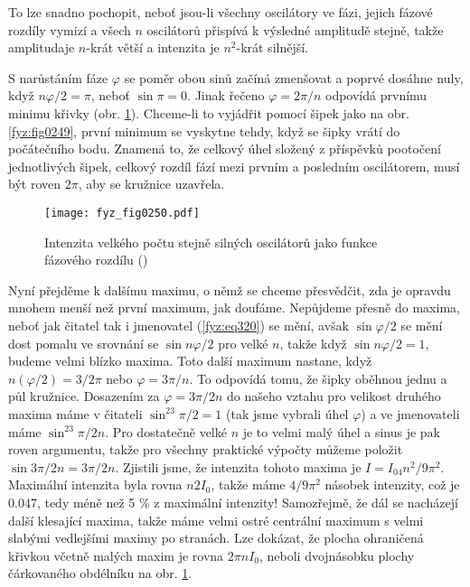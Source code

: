     To lze snadno pochopit, neboť jsou-li všechny oscilátory ve fázi, jejich fázové rozdíly vymizí 
    a všech \(n\) oscilátorů přispívá k výsledné amplitudě stejně, takže amplitudaje \(n\)-krát 
    větší a intenzita je \(n^2\)-krát silnější.
    
    S narůstáním fáze \(\varphi\) se poměr obou sinů začíná zmenšovat a poprvé dosáhne nuly, když 
    \(n\varphi/2 = \pi\), neboť \(\sin\pi = 0\). Jinak řečeno \(\varphi = 2\pi/n\) odpovídá prvnímu 
    minimu křivky (obr. \ref{fyz:fig0250}). Chceme-li to vyjádřit pomocí šipek jako na obr. 
    \ref{fyz:fig0249}, první minimum se vyskytne tehdy, když se šipky vrátí do počátečního bodu. 
    Znamená to, že celkový úhel složený z příspěvků pootočení jednotlivých šipek, celkový rozdíl 
    fází mezi prvním a posledním oscilátorem, musí být roven \(2\pi\), aby se kružnice uzavřela.

    \begin{figure}[ht!] %
      \centering
      \texttt{[image: fyz\_fig0250.pdf]}
      \caption{Intenzita velkého počtu stejně silných oscilátorů jako funkce fázového rozdílu
               (\cite[s.~393]{Feynman01})}
      \label{fyz:fig0250}
    \end{figure}
    
    Nyní přejděme k dalšímu maximu, o němž se chceme přesvědčit, zda je opravdu mnohem menší než 
    první maximum, jak doufáme. Nepůjdeme přesně do maxima, neboť jak čitatel tak i jmenovatel 
    (\ref{fyz:eq320}) se mění, avšak \(\sin\varphi/2\) se mění dost pomalu ve srovnání se \(\sin 
    n\varphi/2\) pro velké \(n\), takže když \(\sin n\varphi/2 = 1\), budeme velmi blízko maxima. 
    Toto další maximum nastane, když \(n(\varphi/2) = 3/2\pi\) nebo \(\varphi = 3\pi/n\). To 
    odpovídá tomu, že šipky oběhnou jednu a půl kružnice. Dosazením za \(\varphi = 3\pi/2n\) do 
    našeho vztahu pro velikost druhého maxima máme v čitateli \(\sin^23\pi/2 = 1\) (tak jsme 
    vybrali úhel \(\varphi\)) a ve jmenovateli máme \(\sin^23\pi/2n\). Pro dostatečně velké \(n\) 
    je to velmi malý úhel a sinus je pak roven argumentu, takže pro všechny praktické výpočty 
    můžeme položit \(\sin3\pi/2n = 3\pi/2n\). Zjistili jsme, že intenzita tohoto maxima je \(I = 
    I_04n^2/9\pi^2\). Maximální intenzita byla rovna \(n2I_0\), takže máme \(4/9\pi^2\) násobek 
    intenzity, což je \num{0.047}, tedy méně než 5 \% z maximální intenzity! Samozřejmě, že 
    dál se nacházejí další klesající maxima, takže máme velmi ostré centrální maximum s velmi 
    slabými vedlejšími maximy po stranách. Lze dokázat, že plocha ohraničená křivkou včetně malých 
    maxim je rovna \(2\pi nI_0\), neboli dvojnásobku plochy čárkovaného obdélníku na obr. 
    \ref{fyz:fig0250}.

